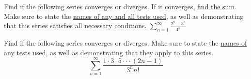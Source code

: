 \documentclass{ximera}
\begin{document}
\newpage
\begin{question}
Find if the following series converges or diverges. If it converges, \underline{find the sum}. Make sure to state the \underline{names of any and all tests used}, as well as demonstrating that this series satisfies all necessary conditions.
$\sum_{n=1}^\infty \frac{2^n+3^n}{4^n}$
\begin{freeResponse}
\end{freeResponse}
\end{question}
\begin{question}
Find if the following series converges or diverges. Make sure to state the \underline{names of any tests used}, as well as demonstrating that they apply to this series.
$$\sum_{n=1}^\infty \frac{1 \cdot 3 \cdot 5 \cdot \cdot \cdot (2n-1)}{3^n n!}$$
\begin{freeResponse}
\end{freeResponse}
\end{question}
\end{document}
